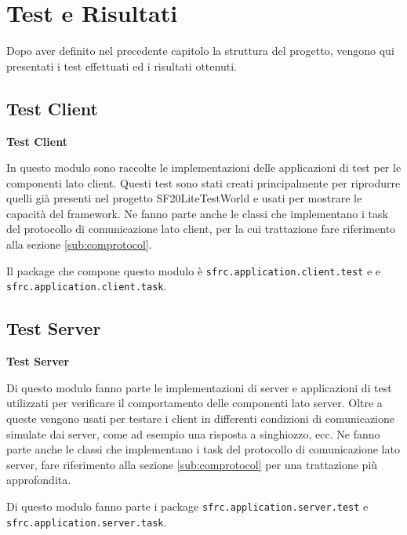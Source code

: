 
\chapter{Test e Risultati}
\label{ch:testerisultati}
Dopo aver definito nel precedente capitolo la struttura del progetto, vengono qui presentati i test effettuati ed i risultati ottenuti.


\section{Test Client}
\label{sec:tclientmodule}

\textbf{Test Client}

In questo modulo sono raccolte le implementazioni delle applicazioni di test per le componenti lato client. Questi test sono stati creati principalmente per riprodurre quelli già presenti nel progetto %
SF20LiteTestWorld e usati per mostrare le capacità del framework.
Ne fanno parte anche le classi che implementano i task del protocollo di comunicazione lato client, per la cui trattazione fare riferimento alla sezione \ref{sub:comprotocol}.

Il package che compone questo modulo è \texttt{sfrc.application.client.test} e e \texttt{sfrc.application.client.task}.



\section{Test Server}
\label{sec:tservermodule}

\textbf{Test Server}

Di questo modulo fanno parte le implementazioni di server e applicazioni di test utilizzati per verificare il comportamento delle componenti lato server. Oltre a queste vengono usati per testare i client in differenti condizioni di comunicazione simulate dai server, come ad esempio una risposta a singhiozzo, ecc.
Ne fanno parte anche le classi che implementano i task del protocollo di comunicazione lato server, fare riferimento alla sezione \ref{sub:comprotocol} per una trattazione più approfondita.

Di questo modulo fanno parte i package \texttt{sfrc.application.server.test} e \texttt{sfrc.application.server.task}.



